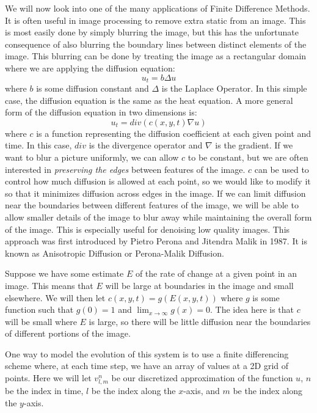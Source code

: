 \label{lab:AnisotropicDiffusion}


We will now look into one of the many applications of Finite Difference Methods.
It is often useful in image processing to remove extra static from an image.
This is most easily done by simply blurring the image, but this has the unfortunate consequence of also blurring the boundary lines between distinct elements of the image.
This blurring can be done by treating the image as a rectangular domain where we are applying the diffusion equation:
\[u_t = b \Delta u\]
where $b$ is some diffusion constant and $\Delta$ is the Laplace Operator.
In this simple case, the diffusion equation is the same as the heat equation.
A more general form of the diffusion equation in two dimensions is:
\[u_t = div \left( c(x,y,t) \nabla u \right)\]
where $c$ is a function representing the diffusion coefficient at each given point and time.
In this case, $div$ is the divergence operator and $\nabla$ is the gradient.
If we want to blur a picture uniformly, we can allow $c$ to be constant, but we are often interested in \textit{preserving the edges} between features of the image.
$c$ can be used to control how much diffusion is allowed at each point, so we would like to modify it so that it minimizes diffusion across edges in the image.
If we can limit diffusion near the boundaries between different features of the image, we will be able to allow smaller details of the image to blur away while maintaining the overall form of the image.
This is especially useful for denoising low quality images. 
This approach was first introduced by Pietro Perona and Jitendra Malik in 1987.
It is known as Anisotropic Diffusion or Perona-Malik Diffusion.

Suppose we have some estimate $E$ of the rate of change at a given point in an image.
This means that $E$ will be large at boundaries in the image and small elsewhere.
We will then let $c(x,y,t) = g(E(x,y,t))$ where $g$ is some function such that $g(0)=1$ and $\displaystyle{\lim_{x \to \infty} g(x) = 0}$. 
The idea here is that $c$ will be small where $E$ is large, so there will be little diffusion near the boundaries of different portions of the image.

One way to model the evolution of this system is to use a finite differencing scheme where, at each time step, we have an array of values at a 2D grid of points.
Here we will let $v_{l,m}^n$ be our discretized approximation of the function $u$, $n$ be the index in time, $l$ be the index along the $x$-axis, and $m$ be the index along the $y$-axis.

